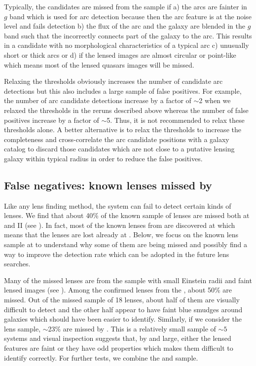 \documentclass[useAMS,usenatbib,a4paper]{mn2e}
\begin{document}
Typically, the candidates are missed from the \af sample if a) the arcs
are fainter in $g$ band which is used for arc detection because then the
arc feature is at the noise level and fails detection b) the flux of the
arc and the galaxy are blended in the $g$ band such that the \af
incorrectly connects part of the galaxy to the arc. This results in a
candidate with no morphological characteristics of a typical arc c)
unusually short or thick arcs or d) if the lensed images are almost
circular or point-like which means most of the lensed quasars images
will be missed.

Relaxing the thresholds obviously increases the number of candidate arc
detections but this also includes a large sample of false positives.
For example, the number of arc candidate detections increase by a factor
of $\sim$2 when we relaxed the thresholds in the reruns described above
whereas the number of false positives increase by a factor of $\sim$5.
Thus, it is not recommended to relax these thresholds alone. A better
alternative is to relax the thresholds to increase the completeness and
cross-correlate the arc candidate positions with a galaxy catalog to
discard those candidates which are not close to a putative lensing
galaxy within typical radius in order to reduce the false positives.




\subsection{False negatives: known lenses missed by \sw}
\label{sec:fn}
Like any lens finding method, the \sw system can fail to detect certain
kinds of lenses.  We find that about 40\% of the known sample of lenses
are missed both at \StageOne and II (see ). In fact, most
of the known lenses from \StageOne are discovered at \StageTwo which
means that the lenses are lost already at \StageOne. Below, we focus on the known
lens sample at \StageOne to understand why some of them are being missed
and possibly find a way to improve the detection rate which can be
adopted in the future \sw lens searches.

Many of the missed lenses are from the \rf sample with small
Einstein radii and faint lensed images (see ). Among
the confirmed lenses from the \rf, about 50\% are missed. Out of the
missed sample of 18 lenses, about half of them are visually difficult to
detect and the other half appear to have faint blue smudges around
galaxies which should have been easier to identify. Similarly,
if we consider the \af lens sample, $\sim$23\% are missed by \sw. This
is a relatively small sample of $\sim 5$ systems and visual inspection
suggests that, by and large, either the lensed features are faint
or they have odd properties which makes them difficult to identify
correctly. For further tests, we combine the \rf and \af sample.
\end{document}
